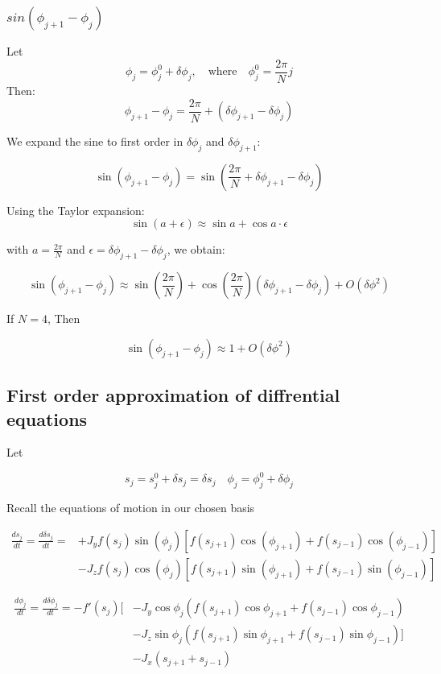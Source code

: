 \documentclass{article}
\begin{document}
\subsubsection{$sin(\phi_{j+1} - \phi_j)$}

Let
\[
\phi_j = \phi_j^0 + \delta \phi_j, \quad \text{where} \quad \phi_j^0 = \frac{2\pi}{N} j
\]
Then:
\[
\phi_{j+1} - \phi_j = \frac{2\pi}{N} + (\delta \phi_{j+1} - \delta \phi_j)
\]

We expand the sine to first order in \( \delta \phi_j \) and \( \delta \phi_{j+1} \):

\[
\sin(\phi_{j+1} - \phi_j) = \sin\left( \frac{2\pi}{N} + \delta \phi_{j+1} - \delta \phi_j \right)
\]

Using the Taylor expansion:
\[
\sin(a + \epsilon) \approx \sin a + \cos a \cdot \epsilon
\]

with \( a = \frac{2\pi}{N} \) and \( \epsilon = \delta \phi_{j+1} - \delta \phi_j \), we obtain:

\[
\boxed{
\sin(\phi_{j+1} - \phi_j) \approx \sin\left( \frac{2\pi}{N} \right) + \cos\left( \frac{2\pi}{N} \right)(\delta \phi_{j+1} - \delta \phi_j) + O(\delta \phi ^2)
}
\]

If $N = 4$, Then

\[
\sin(\phi_{j+1} - \phi_j) \approx 1 + O(\delta \phi ^2)
\]

\subsection{First order approximation of diffrential equations}

Let 

\[
s_j = s_j^0 + \delta s_j = \delta s_j \quad \phi_j = \phi_j^0 + \delta\phi_j
\]

Recall the equations of motion in our chosen basis

\begin{align*}
    \frac{ds_j}{dt} = \frac{d\delta s_j}{dt} = &+J_yf(s_j)\sin(\phi_j)[f(s_{j+1})\cos(\phi_{j+1}) + f(s_{j-1})\cos(\phi_{j-1})] \\
                      &-J_zf(s_j)\cos(\phi_j)[f(s_{j+1})\sin(\phi_{j+1}) + f(s_{j-1})\sin(\phi_{j-1})]
\end{align*}

\begin{align*}
    \frac{d\phi_j}{dt} = \frac{d\delta\phi_j}{dt}  = -f'(s_j)[&-J_y\cos\phi_j(f(s_{j+1})\cos\phi_{j+1} + f(s_{j-1})\cos\phi_{j-1}) \\
                                  &-J_z\sin\phi_j(f(s_{j+1})\sin\phi_{j+1} + f(s_{j-1})\sin\phi_{j-1})] \\
                                  &-J_x(s_{j+1} + s_{j-1})
\end{align*}
\end{document}
